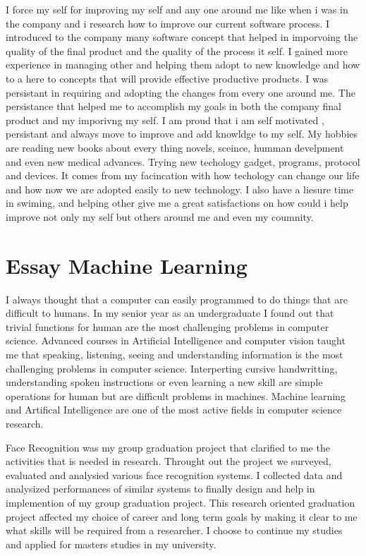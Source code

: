 \documentclass[a4paper,12pt]{article}%
\begin{document}
 I force my self for improving my self and any one around me like when i was in the company and i research how to improve our current software process. I introduced to the company many software concept that helped in imporvoing the quality of the final product and the quality of the process it self. I gained more experience in managing other and helping them adopt to new knowledge and how to a here to concepts that will provide effective productive products.   I was persistant in requiring and adopting the changes from every one around me. The persistance that helped me to accomplish my goals in both the company final product and my imporivng my self. 
 I am proud that i am self motivated  , persistant and always move to improve and add knowldge to my self. My hobbies are reading new books about every thing novels, sceince, humman develpment and even new medical advances.  Trying new techology gadget, programs, protocol and devices. It comes from my facincation with how techology can change our life and how now we are adopted easily to new technology.  I also have a liesure time in swiming, and helping other give me a great satisfactions on how could i help improve not only my self but others around me and even my coumnity.  
\newpage
\section{Essay Machine Learning}
 
 
  I always thought that a computer can easily programmed to do things that are difficult to humans. In my senior year as an undergraduate I found out that trivial functions for human are the most challenging problems in computer science. Advanced courses in Artificial Intelligence and computer vision taught me that speaking, listening, seeing and understanding information is the most challenging problems in computer science. Interperting cursive handwritting,  understanding spoken instructions or even learning a new skill are simple operations for human but are difficult problems in machines. Machine learning and Artifical Intelligence are one of the most active fields in computer science research.
  
  Face Recognition was my group graduation project that clarified to me the activities that is needed in research. Throught out the project we surveyed, evaluated and analysied various face recognition systems. I collected data and analysized performances of similar systems to finally design and help in implemention of my group graduation project. This research oriented graduation project affected my choice of career and long term goals by making it clear to me what skills will be required from a researcher. I choose to continue my studies and applied for masters studies in my university.   %
 
\end{document}
